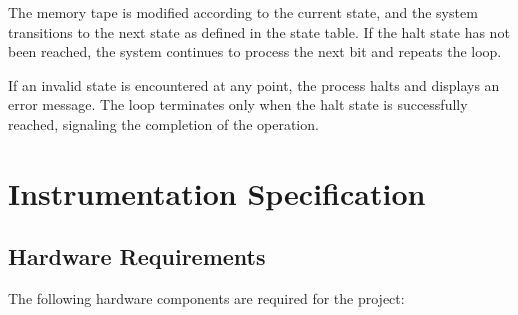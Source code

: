 The memory tape is modified according to the current state, and the system transitions to the next state as defined in the state table. If the halt state has not been reached, the system continues to process the next bit and repeats the loop. 

If an invalid state is encountered at any point, the process halts and displays an error message. The loop terminates only when the halt state is successfully reached, signaling the completion of the operation.

\section{Instrumentation Specification}
\subsection{Hardware Requirements}

The following hardware components are required for the project:

